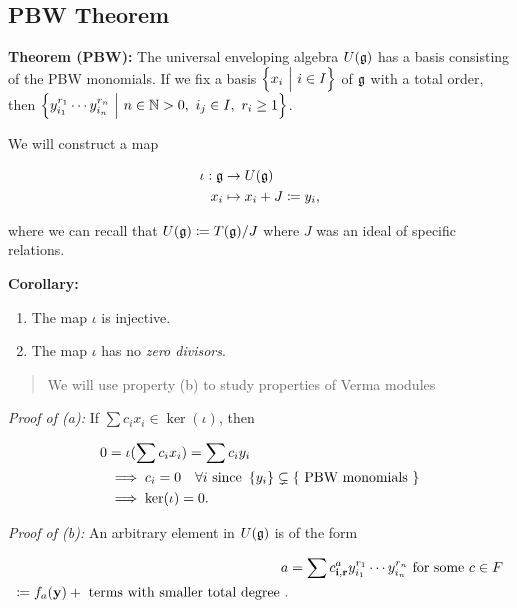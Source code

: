 \hypertarget{pbw-theorem}{%
\subsection{PBW Theorem}\label{pbw-theorem}}

\textbf{Theorem (PBW):} The universal enveloping algebra \(U({\mathfrak{g}})\)
has a basis consisting of the PBW monomials. If we fix a basis
\(\left\{{x_i {~\mathrel{\Big|}~} i\in I}\right\}\) of \({\mathfrak{g}}\) with a total order, then
\(\left\{{y_{i_1}^{r_1} \cdots y_{i_n}^{r_n} {~\mathrel{\Big|}~} n\in {\mathbb{N}} > 0,~ i_j \in I,~ r_i \geq 1}\right\}\).

We will construct a map

\begin{align*}
\iota: {\mathfrak{g}} &\to U({\mathfrak{g}}) \\
x_i &\mapsto x_i + J \coloneqq y_i
,\end{align*}

where we can recall that \(U({\mathfrak{g}}) \coloneqq T({\mathfrak{g}})/ J\) where \(J\)
was an ideal of specific relations.

\textbf{Corollary:}

\begin{enumerate}
\def\labelenumi{\alph{enumi}.}
\tightlist
\item
  The map \(\iota\) is injective.
\item
  The map \(\iota\) has no \emph{zero divisors}.
\end{enumerate}

\begin{quote}
We will use property (b) to study properties of Verma modules
\end{quote}

\emph{Proof of (a):} If \(\sum c_i x_i \in \ker(\iota)\), then

\begin{align*}
0 &= \iota(\sum c_i x_i) = \sum c_i y_i \\
&\implies c_i = 0\quad \forall i \text{ since } \left\{{y_i}\right\} \subsetneq \left\{{\text{ PBW monomials }}\right\}\\
&\implies \ker(\iota) = 0.
\end{align*}

\emph{Proof of (b):} An arbitrary element in \(U({\mathfrak{g}})\) is of the form

\begin{align*}
a &= \sum c^a_{\mathbf{i}, \mathbf{r}} y_{i_1}^{r_1} \cdots y_{i_n}^{r_n} \text{ for some } c\in F \\
\coloneqq f_a(\mathbf{y}) + \text{ terms with smaller total degree }
.\end{align*}

